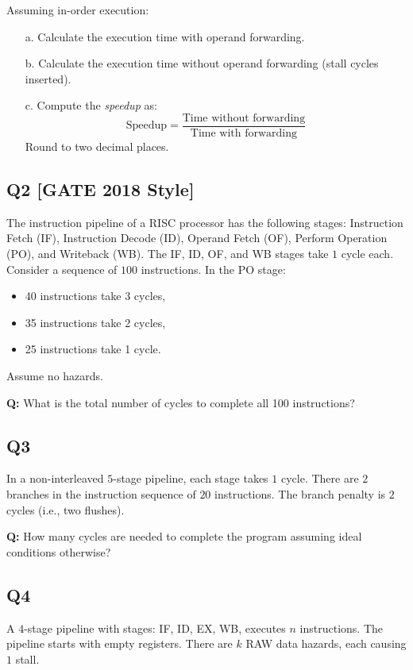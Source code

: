 Assuming in-order execution:
\begin{itemize}
    \item[a.] Calculate the execution time with operand forwarding.
    \item[b.] Calculate the execution time without operand forwarding (stall cycles inserted).
    \item[c.] Compute the \textit{speedup} as:
    \[
    \text{Speedup} = \dfrac{\text{Time without forwarding}}{\text{Time with forwarding}}
    \]
    Round to two decimal places.
\end{itemize}

\subsection*{Q2 [GATE 2018 Style]}
The instruction pipeline of a RISC processor has the following stages: Instruction Fetch (IF), Instruction Decode (ID), Operand Fetch (OF), Perform Operation (PO), and Writeback (WB). The IF, ID, OF, and WB stages take $1$ cycle each. Consider a sequence of $100$ instructions. In the PO stage:
\begin{itemize}
    \item 40 instructions take 3 cycles,
    \item 35 instructions take 2 cycles,
    \item 25 instructions take 1 cycle.
\end{itemize}
Assume no hazards.

\textbf{Q:} What is the total number of cycles to complete all 100 instructions?

\subsection*{Q3}
In a non-interleaved $5$-stage pipeline, each stage takes $1$ cycle. There are $2$ branches in the instruction sequence of $20$ instructions. The branch penalty is $2$ cycles (i.e., two flushes). 

\textbf{Q:} How many cycles are needed to complete the program assuming ideal conditions otherwise?

\subsection*{Q4}
A $4$-stage pipeline with stages: IF, ID, EX, WB, executes $n$ instructions. The pipeline starts with empty registers. There are $k$ RAW data hazards, each causing $1$ stall. 

